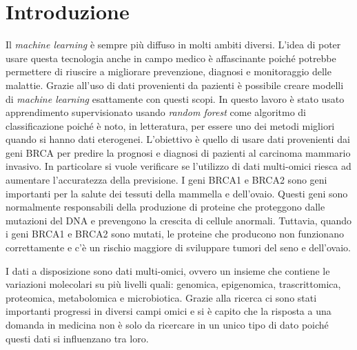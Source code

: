 \documentclass[12pt,italian]{report}
\begin{document}
	\chapter*{Introduzione}
	\label{cap:introduzione}
	Il \textit{machine learning} è sempre più diffuso in molti ambiti diversi. L'idea di poter usare questa tecnologia anche in campo medico è affascinante poiché potrebbe permettere di riuscire a migliorare prevenzione, diagnosi e monitoraggio delle malattie. Grazie all'uso di dati provenienti da pazienti è possibile creare modelli di \textit{machine learning} esattamente con questi scopi. In questo lavoro è stato usato apprendimento supervisionato usando \textit{random forest} come algoritmo di classificazione poiché è noto, in letteratura, per essere uno dei metodi migliori quando si hanno dati eterogenei. L'obiettivo è quello di usare dati provenienti dai geni BRCA per predire la prognosi e diagnosi di pazienti al carcinoma mammario invasivo. In particolare si vuole verificare se l'utilizzo di dati multi-omici riesca ad aumentare l'accuratezza della previsione.
	I geni BRCA1 e BRCA2 sono geni importanti per la salute dei tessuti della mammella e dell'ovaio. Questi geni sono normalmente responsabili della produzione di proteine che proteggono dalle mutazioni del DNA e prevengono la crescita di cellule anormali.
	Tuttavia, quando i geni BRCA1 e BRCA2 sono mutati, le proteine che producono non funzionano correttamente e c'è un rischio maggiore di sviluppare tumori del seno e dell'ovaio.
	
	I dati a disposizione sono dati multi-omici, ovvero un insieme che contiene le variazioni molecolari su più livelli quali: genomica, epigenomica, trascrittomica, proteomica, metabolomica e microbiotica.
	Grazie alla ricerca ci sono stati importanti progressi in diversi campi omici e si è capito che la risposta a una domanda in medicina non è solo da ricercare in un unico tipo di dato poiché questi dati si influenzano tra loro. 
	
\end{document}
